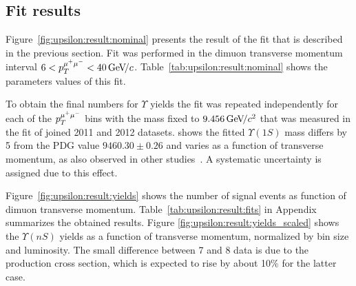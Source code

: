 \subsection{Fit results}
\label{sec:upsilon:result}

Figure~\ref{fig:upsilon:result:nominal} presents the result of the fit that is
described in the previous section. Fit was performed in the dimuon
transverse momentum interval $ 6 < p_T^{{\mu^+\mu^-}} < 40 {\mathrm{\,Ge\kern -0.1em V\!/}c}$.
Table~\ref{tab:upsilon:result:nominal} shows the parameters values of this fit.







% 


To obtain the final numbers for $\Upsilon$ yields the fit was repeated
independently for each of the $p_T^{{\mu^+\mu^-}}$ bins with the \OneS mass fixed to
$9.456 {\mathrm{\,Ge\kern -0.1em V\!/}c^2}$ that was measured in the fit of joined 2011 and 2012 datasets.
 shows  the fitted $\Upsilon(1S)$
mass differs by 5 \mevcc from the PDG value $9460.30 \pm  0.26$ \mevcc and
varies as a function of transverse momentum, as also observed in other
studies~\cite{Aaij:2013yaa}. A systematic uncertainty is assigned due to this
effect.

Figure~\ref{fig:upsilon:result:yields} shows the number of signal events as
function of dimuon transverse momentum. Table~\ref{tab:upsilon:result:fits} in
Appendix summarizes the obtained results. Figure
\ref{fig:upsilon:result:yields_scaled} shows the $\Upsilon(nS)$ yields as a
function of transverse momentum, normalized by bin size and luminosity. The
small difference between 7 and 8 \tev data is due to the production cross
section, which is expected to rise by about 10\% for the latter case.





